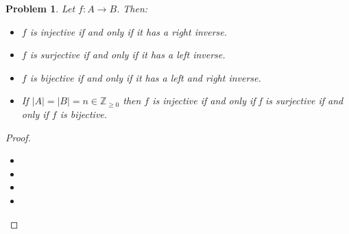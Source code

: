 \documentclass[10pt]{article}
\newcommand{\bb}[1]{\mathbb{#1}}
\theoremstyle{plain}
\newtheorem{problem}{Problem}
\theoremstyle{remark}
\begin{document}
\begin{problem}
  Let $f:A\rightarrow B$. Then:
  \begin{itemize}
  \item[a)] $f$ is injective if and only if it has a right inverse.
  \item[b)] $f$ is surjective if and only if it has a left inverse.
  \item[c)] $f$ is bijective if and only if it has a left and right inverse.
  \item[d)] If $|A|=|B|=n\in \bb{Z}_{\geq0}$ then $f$ is injective if and only if f is
    surjective if and only if $f$ is bijective.
  \end{itemize}
\end{problem}

\begin{proof}\ \\
  \begin{itemize}
  \item[a)] 
  \item[b)]
  \item[c)]
  \item[d)]
  \end{itemize}
\end{proof}

\end{document}

